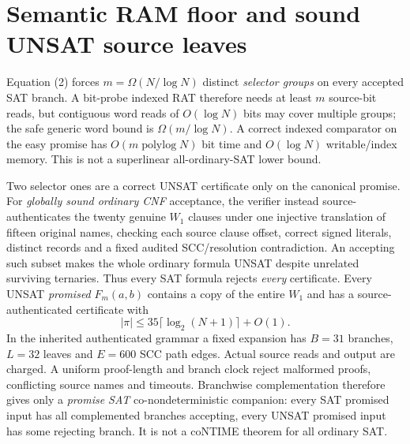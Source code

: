 \documentclass[11pt]{article}
\begin{document}
\section{Semantic RAM floor and sound UNSAT source leaves}
Equation (2) forces $m=\Omega(N/\log N)$ distinct
\emph{selector groups} on every accepted SAT branch.
A bit-probe indexed RAT therefore needs at least $m$
source-bit reads, but contiguous word reads of
$O(\log N)$ bits may cover multiple groups; the
safe generic word bound is $\Omega(m/\log N)$.
A correct indexed comparator on the easy promise
has $O(m\operatorname{polylog}N)$ bit time and
$O(\log N)$ writable/index memory.
This is not a superlinear all-ordinary-SAT lower bound.

Two selector ones are a correct UNSAT certificate only
on the canonical promise. For \emph{globally sound ordinary
CNF} acceptance, the verifier instead source-authenticates
the twenty genuine $W_1$ clauses under one injective
translation of fifteen original names, checking each
source clause offset, correct signed literals, distinct
records and a fixed audited SCC/resolution contradiction.
An accepting such subset makes the whole ordinary formula
UNSAT despite unrelated surviving ternaries. Thus every
SAT formula rejects \emph{every} certificate. Every UNSAT
\emph{promised} $F_m(a,b)$ contains a copy of the entire
$W_1$ and has a source-authenticated certificate with
\[
|\pi|\le35\lceil\log_2(N+1)\rceil+O(1). \tag{3}
\]
In the inherited authenticated grammar a fixed expansion
has $B=31$ branches, $L=32$ leaves and $E=600$ SCC
path edges. Actual source reads and output are charged.
A uniform proof-length and branch clock reject malformed
proofs, conflicting source names and timeouts.
Branchwise complementation therefore gives only a
\emph{promise SAT} co-nondeterministic companion:
every SAT promised input has all complemented branches
accepting, every UNSAT promised input has some rejecting
branch. It is not a coNTIME theorem for all ordinary SAT.
\end{document}
